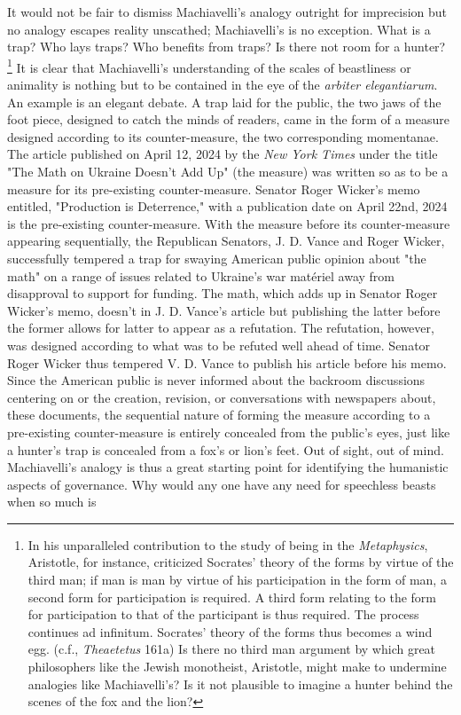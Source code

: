 \documentclass[10pt,a4paper,twoside]{article} %
\begin{document}
\begin{multicols}{2}
{\newline \indent It would not be fair to dismiss Machiavelli's analogy outright for imprecision but no analogy escapes reality unscathed; Machiavelli's is no exception. What is a trap? Who lays traps? Who benefits from traps? Is there not room for a hunter? \footnote{In his unparalleled contribution to the study of being in the \emph{Metaphysics}, Aristotle, for instance, criticized Socrates' theory of the forms by virtue of the third man; if man is man by virtue of his participation in the form of man, a second form for participation is required. A third form relating to the form for participation to that of the participant is thus required. The process continues ad infinitum. Socrates' theory of the forms thus becomes a wind egg. (c.f., \emph{Theaetetus} 161a) Is there no third man argument by which great philosophers like the Jewish monotheist, Aristotle, might make to undermine analogies like Machiavelli's? Is it not plausible to imagine a hunter behind the scenes of the fox and the lion? } \newline \indent It is clear that Machiavelli's understanding of the scales of beastliness or animality is nothing but to be contained in the eye of the \emph{arbiter elegantiarum}. An example is an elegant debate. A trap laid for the public, the two jaws of the foot piece, designed to catch the minds of readers, came in the form of a measure designed according to its counter-measure, the two corresponding momentanae.  \newline \indent The article published on April 12, 2024 by the \emph{New York Times} under the title "The Math on Ukraine Doesn't Add Up"  (the measure) was written so as to be a measure for its pre-existing counter-measure. Senator Roger Wicker's memo entitled, "Production is Deterrence," with a publication date on April 22nd, 2024 is the pre-existing counter-measure. With the measure before its counter-measure appearing sequentially, the Republican Senators, J. D. Vance and Roger Wicker, successfully tempered a trap for swaying American public opinion about "the math" on a range of issues related to Ukraine's war \textfrench{matériel} away from disapproval to support for funding. The math, which adds up in Senator Roger Wicker's memo, doesn't in J. D. Vance's article but publishing the latter before the former allows for latter to appear as a refutation. The refutation, however, was designed according to what was to be refuted well ahead of time. Senator Roger Wicker thus tempered V. D. Vance to publish his article before his memo.  \newline \indent Since the American public is never informed about the backroom discussions centering on or the creation, revision, or conversations with newspapers about, these documents, the sequential nature of forming the measure according to a pre-existing counter-measure is entirely concealed from the public's eyes, just like a hunter's trap is concealed from a fox's or lion's feet. Out of sight, out of mind. Machiavelli's analogy is thus a great starting point for identifying the humanistic aspects of governance. Why would any one have any need for speechless beasts when so much is }
\end{multicols}
\end{document}

